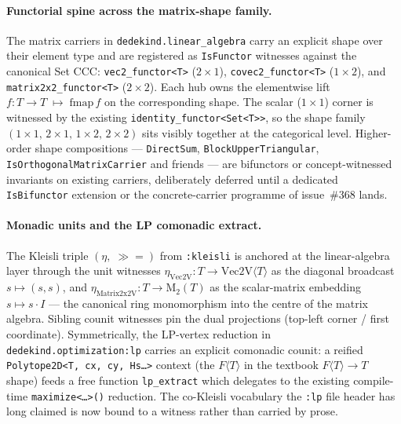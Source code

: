 \documentclass[11pt, a4paper]{report}
\begin{document}
\paragraph{Functorial spine across the matrix-shape family.} The matrix carriers in \texttt{dedekind.linear\_algebra} carry an explicit shape over their element type and are registered as \texttt{IsFunctor} witnesses against the canonical Set CCC: \texttt{vec2\_functor<T>} ($2\times 1$), \texttt{covec2\_functor<T>} ($1\times 2$), and \texttt{matrix2x2\_functor<T>} ($2\times 2$). Each hub owns the elementwise lift $f: T\to T \;\mapsto\; \mathrm{fmap}\, f$ on the corresponding shape. The scalar ($1\times 1$) corner is witnessed by the existing \texttt{identity\_functor<Set<T>>}, so the shape family $(1\times 1,\,2\times 1,\,1\times 2,\,2\times 2)$ sits visibly together at the categorical level. Higher-order shape compositions --- \texttt{DirectSum}, \texttt{BlockUpperTriangular}, \texttt{IsOrthogonalMatrixCarrier} and friends --- are bifunctors or concept-witnessed invariants on existing carriers, deliberately deferred until a dedicated \texttt{IsBifunctor} extension or the concrete-carrier programme of issue~\#368 lands.

\paragraph{Monadic units and the LP comonadic extract.} The Kleisli triple $(\eta,\;\gg=)$ from \texttt{:kleisli} is anchored at the linear-algebra layer through the unit witnesses $\eta_{\mathrm{Vec2V}}: T \to \mathrm{Vec2V}\langle T\rangle$ as the diagonal broadcast $s \mapsto (s, s)$, and $\eta_{\mathrm{Matrix2x2V}}: T \to \mathrm{M}_2(T)$ as the scalar-matrix embedding $s \mapsto s\cdot I$ --- the canonical ring monomorphism into the centre of the matrix algebra. Sibling counit witnesses pin the dual projections (top-left corner / first coordinate). Symmetrically, the LP-vertex reduction in \texttt{dedekind.optimization:lp} carries an explicit comonadic counit: a reified \texttt{Polytope2D<T, cx, cy, Hs\dots{}>} context (the $F\langle T\rangle$ in the textbook $F\langle T\rangle \to T$ shape) feeds a free function \texttt{lp\_extract} which delegates to the existing compile-time \texttt{maximize<\dots{}>()} reduction. The co-Kleisli vocabulary the \texttt{:lp} file header has long claimed is now bound to a witness rather than carried by prose.
\end{document}

